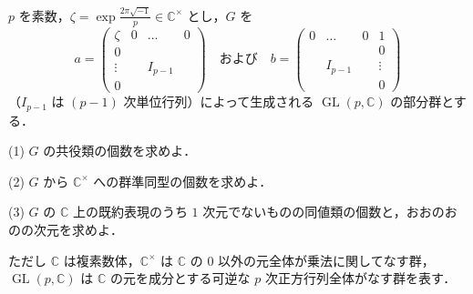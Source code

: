 \documentclass[12pt]{jlreq}
\newcommand{\C}{\mathbb{C}}
\begin{document}
\(p\) を素数，\(\zeta = \exp \frac{2\pi\sqrt{-1}}{p} \in \C^\times\) とし，\(G\) を
\[
  a = \begin{pmatrix} \zeta & 0 & \dots & 0 \\ 0 & & & \\ \vdots & & I_{p-1} & \\ 0 & & & \end{pmatrix} \quad \text{および} \quad b = \begin{pmatrix} 0 & \dots & 0 & 1 \\ & & & 0 \\ & I_{p-1} & & \vdots \\ & & & 0 \end{pmatrix}
\]
（\(I_{p-1}\) は \((p-1)\) 次単位行列）によって生成される \(\operatorname{GL}(p, \C)\) の部分群とする．

(1) \(G\) の共役類の個数を求めよ．

(2) \(G\) から \(\C^\times\) への群準同型の個数を求めよ．

(3) \(G\) の \(\C\) 上の既約表現のうち \(1\) 次元でないものの同値類の個数と，おおのおのの次元を求めよ．

ただし \(\C\) は複素数体，\(\C^\times\) は \(\C\) の \(0\) 以外の元全体が乗法に関してなす群，\(\operatorname{GL}(p, \C)\) は \(\C\) の元を成分とする可逆な \(p\) 次正方行列全体がなす群を表す．
\end{document}
